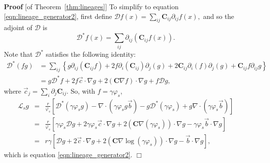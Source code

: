 \documentclass[12pt]{article}
\newenvironment {proof}{{\noindent\bf Proof }}{\hfill $\Box$ \medskip}
\newcommand{\grad}{\nabla}
\newcommand{\DD}{\mathcal{D}}  %
\newcommand{\meanq}{\vec b}    %
\newcommand{\covq}{\mathbf{C}}     %
\newcommand{\Lgen}{\mathcal{L}}    %
\numberwithin{equation}{section}
\begin{document}
\begin{proof}[of Theorem~\ref{thm:lineages}]
To simplify to equation \eqref{eqn:lineage_generator2},
first define
$
    \DD f(x) = \sum_{ij} \covq_{ij} \partial_{ij} f(x),
$
and so the adjoint of $\DD$ is
$$
    \DD^* f(x)
    =
    \sum_{ij} \partial_{ij} (\covq_{ij} f(x)) .
$$
Note that $\DD^*$ satisfies the following identity:
\begin{align*}
    \DD^*(fg)
    &=
    \sum_{ij} \left\{
        g \partial_{ij} (\covq_{ij} f)
        + 2 f \partial_{i} (\covq_{ij}) \partial_j(g)
        + 2 \covq_{ij} \partial_{i} (f) \partial_j(g)
        + \covq_{ij} f \partial_{ij} g
    \right\} \\
    &=
    g \DD^* f
    + 2 f \vec{c} \cdot \grad g
    + 2 (\covq \grad f) \cdot \grad g
    + f \DD g ,
\end{align*}
where $\vec{c}_j = \sum_i \partial_j \covq_{ij}$.
So, with $f = \gamma \varphi_s$,
\begin{eqnarray*}
\Lgen_s g
    &=&
    \frac{r}{\varphi_s} \left[
        \DD^*(\gamma \varphi_s g) - \grad \cdot (\gamma \varphi_s g \meanq)
        - g \DD^*(\gamma \varphi_s) + g \grad \cdot (\gamma \varphi_s \meanq)
    \right] \\
    &=&
    \frac{r}{\varphi_s} \left[
        \gamma \varphi_s \DD g
        + 2 \gamma \varphi_s \vec{c} \cdot \grad g
        + 2 (\covq \grad (\gamma \varphi_s)) \cdot \grad g
        - \gamma \varphi_s \meanq \cdot \grad g
    \right] \\
    &=&
    r \gamma \left[
        \DD g
        + 2 \vec{c} \cdot \grad g
        + 2 (\covq \grad \log(\gamma \varphi_s)) \cdot \grad g
        - \meanq \cdot \grad g
    \right] ,
\end{eqnarray*}
which is equation \eqref{eqn:lineage_generator2}.
\end{proof}
\end{document}
